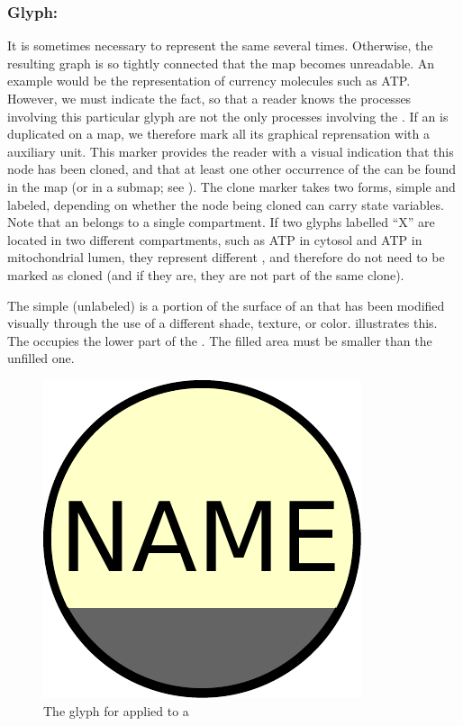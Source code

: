 \subsubsection{Glyph: }
\label{sec:cloneMarker}

It is sometimes necessary to represent the same  several times. Otherwise, the resulting graph is so tightly connected that the map becomes unreadable. An example would be the representation of currency molecules such as ATP. However, we must indicate the fact, so that a reader knows the processes involving this particular glyph are not the only processes involving the . If an  is duplicated on a map, we therefore mark all its graphical reprensation with a  auxiliary unit.  This marker provides the reader with a visual indication that this node has been cloned, and that at least one other occurrence of the  can be found in the map (or in a submap; see ).  The clone marker takes two forms, simple and labeled, depending on whether the node being cloned can carry state variables. Note that an  belongs to a single compartment. If two glyphs labelled ``X'' are located in two different compartments, such as ATP in cytosol and ATP in mitochondrial lumen, they represent different , and therefore do not need to be marked as cloned (and if they are, they are not part of the same clone).

The simple (unlabeled)  is a portion of the surface of an  that has been modified visually through the use of a different shade, texture, or color.   illustrates this. The  occupies the lower part of the . The filled area must be smaller than the unfilled one.

\begin{figure}[H]
  \centering
  \includegraphics[scale = 0.3]{le_images/simpleCloneMarker}
  \caption{The \PD glyph for  applied to a }
  \label{fig:simpleCloneMarker}
\end{figure}

